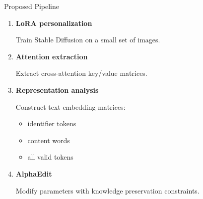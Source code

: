 \documentclass[aspectratio=169]{beamer}
\begin{document}
\begin{frame}{Proposed Pipeline}


\begin{enumerate}[1)]

\item \textbf{LoRA personalization}

Train Stable Diffusion on a small set of images.

\vspace{0.2cm}

\item \textbf{Attention extraction}

Extract cross-attention key/value matrices.

\vspace{0.2cm}

\item \textbf{Representation analysis}

Construct text embedding matrices:

\begin{itemize}
    \item identifier tokens
    \item content words
    \item all valid tokens
\end{itemize}


\item \textbf{AlphaEdit}

Modify parameters with knowledge preservation constraints.


\end{enumerate}


\end{frame}


\end{document}
